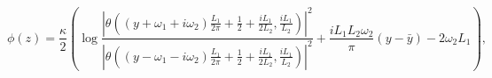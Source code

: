 \begin{equation}\label{phi}
\phi(z)=\frac{\kappa}{2}\left(
\log
\frac{\left|\theta\left(
(y+\omega_1+i\omega_2)\frac{L_1}{2\pi}
+\frac{1}{2}+\frac{iL_1}{2L_2},\frac{iL_1}{L_2}\right)\right|^2}
{\left|\theta\left(
(y-\omega_1-i\omega_2)\frac{L_1}{2\pi}
+\frac{1}{2}+\frac{iL_1}{2L_2},\frac{iL_1}{L_2}\right)\right|^2}
+\frac{iL_1 L_2 \omega_2}{\pi} (y-\bar y)-
2\omega_2 L_1
\right),
\end{equation}

